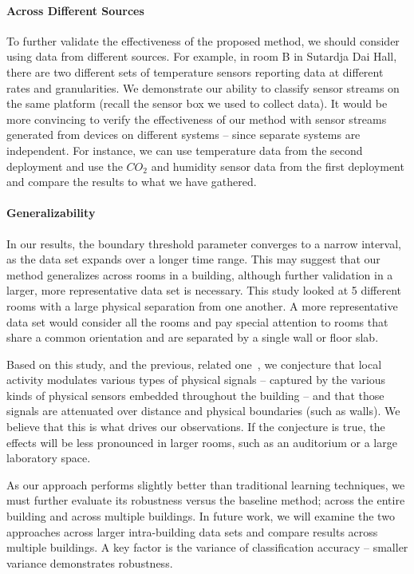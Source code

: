 \paragraph{Across Different Sources}
To further validate the effectiveness of the proposed method, we should consider using data from different sources.
For example, in room B in Sutardja Dai Hall, there are two different sets of temperature sensors reporting data at different rates and granularities.
We demonstrate our ability to classify sensor streams on the same platform (recall the sensor box we used to collect data). 
It would be more convincing to verify the effectiveness of our method with sensor streams generated from devices on
 different systems -- since separate systems are independent.  For instance, we can use temperature data from the second deployment 
 and use the $CO_{2}$ and humidity sensor data from the first deployment and compare the results to what we have gathered.

\paragraph{Generalizability} In our results, the boundary threshold parameter converges to a narrow interval, as the data set expands 
over a longer time range.  This may suggest that our method generalizes across rooms in a building, although further validation in a 
larger, more representative data set is necessary.  This study looked at 5 different rooms with a large physical separation from one
another.  A more representative data set would consider all the rooms and pay special attention to rooms that share a common orientation
and are separated by a single wall or floor slab.
  
Based on this study, and the previous, related one~\cite{IOT}, we conjecture that local activity modulates various types of physical 
signals -- captured by the various kinds of physical sensors embedded
throughout the building -- and that those signals are attenuated
over distance and physical boundaries (such as walls).  We believe that this is what drives our observations. 
If the conjecture is true, the effects will be less pronounced in larger rooms, such as an auditorium or a large laboratory space.


As our approach performs slightly better than traditional learning techniques, we must further evaluate its robustness
versus the baseline method; across the entire building and across multiple buildings.  In future work, we will examine the 
two approaches across larger intra-building data sets and compare results across multiple buildings.
A key factor is the variance of classification accuracy -- smaller variance demonstrates robustness.  

